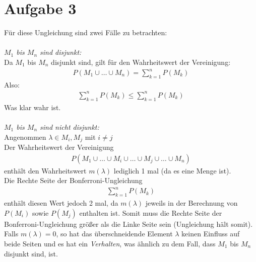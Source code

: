 \pagebreak
\section*{Aufgabe 3}
Für diese Ungleichung sind zwei Fälle zu betrachten:\\\\
\emph{$ M_1$ bis $M_n$ sind disjunkt:}\\
Da $ M_1 $ bis $ M_n $ disjunkt sind, gilt für den Wahrheitswert der Vereinigung:
\begin{align*}
  P(M_1\cup\ldots\cup M_n) = \sum_{k=1}^{n}P(M_k)
\end{align*}
Also:
\begin{align*}
  \sum_{k=1}^{n}P(M_k) \le \sum_{k=1}^{n}P(M_k)
\end{align*}
Was klar wahr ist.\\\\
\emph{$ M_1$ bis $M_n$ sind nicht disjunkt:}\\
Angenommen $ \lambda\in M_i,M_j $ mit $ i \not= j $\\
Der Wahrheitswert der Vereinigung
\begin{align*}
P(M_1\cup\dots\cup M_i\cup\dots\cup M_j\cup\dots\cup M_n)
\end{align*}
enthält den Wahrheitswert $ m(\lambda) $ lediglich 1 mal (da es eine Menge ist).\\
Die Rechte Seite der Bonferroni-Ungleichung
\begin{align*}
  \sum_{k=1}^{n}P(M_k)
\end{align*}
enthält diesen Wert jedoch 2 mal, da $ m(\lambda) $ jeweils in der Berechnung von $ P(M_i) $ sowie $ P(M_j) $ enthalten ist. Somit muss die Rechte Seite der Bonferroni-Ungleichung größer als die Linke Seite sein (Ungleichung hält somit). Falls $ m(\lambda)=0 $, so hat das überschneidende Element $ \lambda $ keinen Einfluss auf beide Seiten und es hat ein \emph{Verhalten}, was ähnlich zu dem Fall, dass $ M_1 $ bis $ M_n $ disjunkt sind, ist.